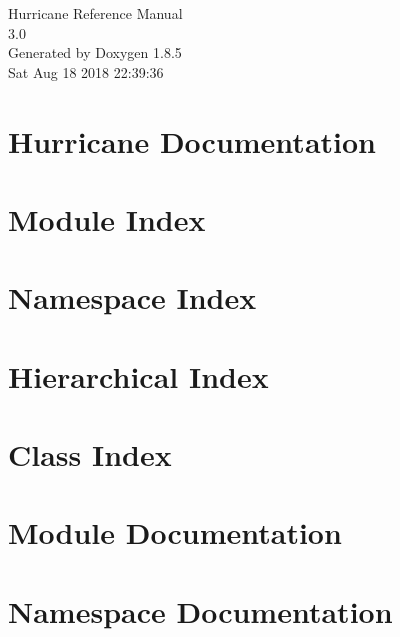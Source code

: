 \documentclass[a4paper]{asimbook}
\begin{document}
   \begin{titlepage}
     \vspace*{7cm}
     \begin{center}
     {\Large Hurricane Reference Manual\\[1ex]\large 3.0 }\\
     \vspace*{1cm}
     {\large Generated by Doxygen 1.8.5}\\
     \vspace*{0.5cm}
     {\small Sat Aug 18 2018 22:39:36}\\
     \end{center}
   \end{titlepage}

   \clearemptydoublepage

   \tableofcontents
   \clearemptydoublepage

\chapter{Hurricane Documentation}
\label{index}\hypertarget{index}{}
\chapter{Module Index}

\chapter{Namespace Index}

\chapter{Hierarchical Index}

\chapter{Class Index}

\chapter{Module Documentation}




\chapter{Namespace Documentation}

\end{document}
